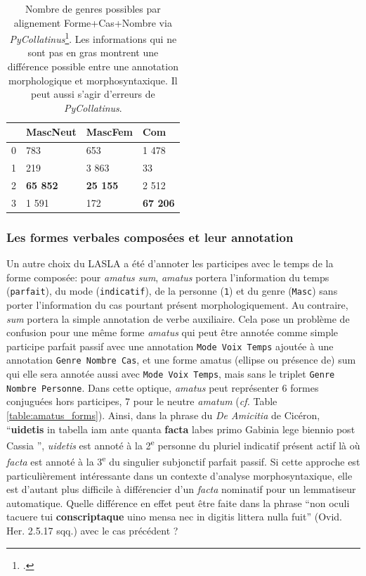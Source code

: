 \begin{table}[h]
\centering
\begin{tabular}{l|lll}
\toprule
         & MascNeut & MascFem & Com    \\ \midrule
0        & 783      & 653     & 1 478  \\
1        & 219      & 3 863   & 33     \\
2        & \textbf{65 852}   & \textbf{25 155}  & 2 512  \\
3        & 1 591    & 172     & \textbf{67 206} \\ \bottomrule
\end{tabular}
\caption{Nombre de genres possibles par alignement Forme+Cas+Nombre via \textit{PyCollatinus}\footcite[\textit{PyCollatinus} est une traduction en python de \textit{Collatinus, cf. }]{thibault_clerice_2018_1243076}. Les informations qui ne sont pas en gras montrent une différence possible entre une annotation morphologique et morphosyntaxique. Il peut aussi s'agir d'erreurs de \textit{PyCollatinus}.}
\label{table:lasla:genders-alignement}
\end{table}

\subsubsection{Les formes verbales composées et leur annotation}

Un autre choix du LASLA a été d'annoter les participes avec le temps de la forme composée: pour \textit{amatus sum}, \textit{amatus} portera l'information du temps (\texttt{parfait}), du mode (\texttt{indicatif}), de la personne (\texttt{1}) et du genre (\texttt{Masc}) sans porter l'information du cas pourtant présent morphologiquement. Au contraire, \textit{sum} portera la simple annotation de verbe auxiliaire. Cela pose un problème de confusion pour une même forme \textit{amatus} qui peut être annotée comme simple participe parfait passif avec une annotation \texttt{Mode Voix Temps} ajoutée à une annotation \texttt{Genre Nombre Cas}, et une forme amatus (ellipse ou présence de) sum qui elle sera annotée aussi avec \texttt{Mode Voix Temps}, mais sans le triplet \texttt{Genre Nombre Personne}. Dans cette optique, \textit{amatus} peut représenter 6 formes conjuguées hors participes, 7 pour le neutre \textit{amatum} (\textit{cf.} Table \ref{table:amatus_forms}). %
%
%
Ainsi, dans la phrase du \textit{De Amicitia} de Cicéron, \enquote{\textbf{uidetis} in tabella iam ante quanta \textbf{facta} labes primo Gabinia lege biennio post Cassia }, \textit{uidetis} est annoté à la 2\textsuperscript{e} personne du pluriel indicatif présent actif là où \textit{facta} est annoté à la 3\textsuperscript{e} du singulier subjonctif parfait passif. Si cette approche est particulièrement intéressante dans un contexte d'analyse morphosyntaxique, elle est d'autant plus difficile à différencier d'un \textit{facta} nominatif pour un lemmatiseur automatique. Quelle différence en effet peut être faite dans la phrase \enquote{non oculi tacuere tui \textbf{conscriptaque} uino mensa nec in digitis littera nulla fuit} (Ovid. Her. 2.5.17 sqq.) avec le cas précédent ? %

